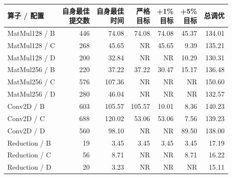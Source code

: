 \begin{tabular*}{\textwidth}{@{\extracolsep{\fill}}lrrrrrr@{}}
\toprule
算子 / 配置 & \shortstack{自身最佳\\提交数} & \shortstack{自身最佳\\时间} & \shortstack{严格\\目标} & \shortstack{+1\%\\目标} & \shortstack{+5\%\\目标} & 总调优 \\
\midrule
MatMul128 / B & 446 & 74.08 & 74.08 & 74.08 & 45.37 & 134.01 \\
MatMul128 / C & 268 & 45.65 & NR & 45.65 & 9.39 & 135.21 \\
MatMul128 / D & 200 & 32.84 & NR & NR & 10.29 & 130.31 \\
\midrule
MatMul256 / B & 220 & 37.22 & 37.22 & 30.47 & 15.17 & 136.48 \\
MatMul256 / C & 576 & 107.36 & NR & NR & NR & 150.60 \\
MatMul256 / D & 280 & 46.04 & NR & NR & NR & 132.57 \\
\midrule
Conv2D / B & 603 & 105.57 & 105.57 & 10.01 & 8.36 & 140.23 \\
Conv2D / C & 688 & 120.02 & 53.06 & 53.06 & 7.56 & 139.23 \\
Conv2D / D & 560 & 98.10 & NR & NR & 89.50 & 138.00 \\
\midrule
Reduction / B & 19 & 3.45 & 3.45 & 3.45 & 3.45 & 17.19 \\
Reduction / C & 56 & 8.71 & NR & NR & 8.71 & 16.22 \\
Reduction / D & 20 & 3.23 & NR & NR & NR & 15.11 \\
\bottomrule
\end{tabular*}
